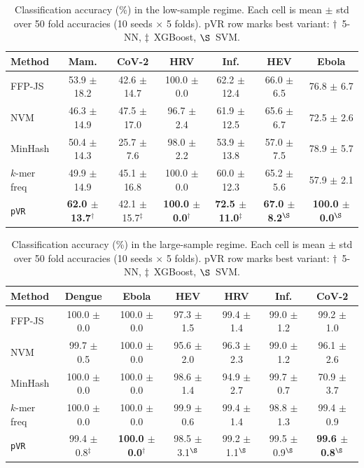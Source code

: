 \begin{table}[!t]
\centering
\footnotesize
\caption{Classification accuracy (\%) in the low-sample regime. Each cell is mean $\pm$ std over 50 fold accuracies (10 seeds $\times$ 5 folds). pVR row marks best variant: $\dagger$~5-NN, $\ddagger$~XGBoost, $\S$~SVM.}
\label{tab:main-small}
\setlength{\tabcolsep}{3pt}
\begin{tabular}{lcccccc}
\hline
Method & Mam. & CoV-2 & HRV & Inf. & HEV & Ebola \\
\hline
FFP-JS & 53.9 $\pm$ 18.2 & 42.6 $\pm$ 14.7 & 100.0 $\pm$ 0.0 & 62.2 $\pm$ 12.4 & 66.0 $\pm$ 6.5 & 76.8 $\pm$ 6.7 \\
NVM & 46.3 $\pm$ 14.9 & 47.5 $\pm$ 17.0 & 96.7 $\pm$ 2.4 & 61.9 $\pm$ 12.5 & 65.6 $\pm$ 6.7 & 72.5 $\pm$ 2.6 \\
MinHash & 50.4 $\pm$ 14.3 & 25.7 $\pm$ 7.6 & 98.0 $\pm$ 2.2 & 53.9 $\pm$ 13.8 & 57.0 $\pm$ 7.5 & 78.9 $\pm$ 5.7 \\
$k$-mer freq & 49.9 $\pm$ 14.9 & 45.1 $\pm$ 16.8 & 100.0 $\pm$ 0.0 & 60.0 $\pm$ 12.3 & 65.2 $\pm$ 5.6 & 57.9 $\pm$ 2.1 \\
\texttt{pVR} & \textbf{62.0 $\pm$ 13.7}$^{\dagger}$ & 42.1 $\pm$ 15.7$^{\ddagger}$ & \textbf{100.0 $\pm$ 0.0}$^{\dagger}$ & \textbf{72.5 $\pm$ 11.0}$^{\ddagger}$ & \textbf{67.0 $\pm$ 8.2}$^{\S}$ & \textbf{100.0 $\pm$ 0.0}$^{\S}$ \\
\hline
\end{tabular}
\end{table}

\begin{table}[!t]
\centering
\footnotesize
\caption{Classification accuracy (\%) in the large-sample regime. Each cell is mean $\pm$ std over 50 fold accuracies (10 seeds $\times$ 5 folds). pVR row marks best variant: $\dagger$~5-NN, $\ddagger$~XGBoost, $\S$~SVM.}
\label{tab:main-large}
\setlength{\tabcolsep}{3pt}
\begin{tabular}{lcccccc}
\hline
Method & Dengue & Ebola & HEV & HRV & Inf. & CoV-2 \\
\hline
FFP-JS & 100.0 $\pm$ 0.0 & 100.0 $\pm$ 0.0 & 97.3 $\pm$ 1.5 & 99.4 $\pm$ 1.4 & 99.0 $\pm$ 1.2 & 99.2 $\pm$ 1.0 \\
NVM & 99.7 $\pm$ 0.5 & 100.0 $\pm$ 0.0 & 95.6 $\pm$ 2.0 & 96.3 $\pm$ 2.3 & 99.0 $\pm$ 1.2 & 96.1 $\pm$ 2.6 \\
MinHash & 100.0 $\pm$ 0.0 & 100.0 $\pm$ 0.0 & 98.6 $\pm$ 1.4 & 94.9 $\pm$ 2.7 & 99.7 $\pm$ 0.7 & 70.9 $\pm$ 3.7 \\
$k$-mer freq & 100.0 $\pm$ 0.0 & 100.0 $\pm$ 0.0 & 99.9 $\pm$ 0.6 & 99.4 $\pm$ 1.4 & 98.8 $\pm$ 1.3 & 99.4 $\pm$ 0.9 \\
\texttt{pVR} & 99.4 $\pm$ 0.8$^{\ddagger}$ & \textbf{100.0 $\pm$ 0.0}$^{\dagger}$ & 98.5 $\pm$ 3.1$^{\S}$ & 99.2 $\pm$ 1.1$^{\S}$ & 99.5 $\pm$ 0.9$^{\S}$ & \textbf{99.6 $\pm$ 0.8}$^{\S}$ \\
\hline
\end{tabular}
\end{table}
